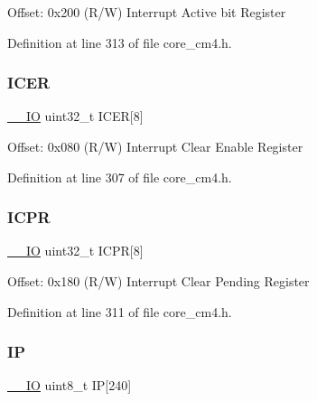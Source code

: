 Offset\+: 0x200 (R/W) Interrupt Active bit Register 

Definition at line 313 of file core\+\_\+cm4.\+h.

\mbox{\label{struct_n_v_i_c___type_af458bc93cfb899fc1c77c5d1f39dde88}} 
\subsubsection{\texorpdfstring{I\+C\+ER}{ICER}}
{\footnotesize\ttfamily \hyperlink{group___c_m_s_i_s__core__definitions_gaec43007d9998a0a0e01faede4133d6be}{\+\_\+\+\_\+\+IO} uint32\+\_\+t I\+C\+ER\mbox{[}8\mbox{]}}

Offset\+: 0x080 (R/W) Interrupt Clear Enable Register 

Definition at line 307 of file core\+\_\+cm4.\+h.

\mbox{\label{struct_n_v_i_c___type_a8165d9a8c0090021e56bbe91c2c44667}} 
\subsubsection{\texorpdfstring{I\+C\+PR}{ICPR}}
{\footnotesize\ttfamily \hyperlink{group___c_m_s_i_s__core__definitions_gaec43007d9998a0a0e01faede4133d6be}{\+\_\+\+\_\+\+IO} uint32\+\_\+t I\+C\+PR\mbox{[}8\mbox{]}}

Offset\+: 0x180 (R/W) Interrupt Clear Pending Register 

Definition at line 311 of file core\+\_\+cm4.\+h.

\mbox{\label{struct_n_v_i_c___type_a38c377984f751265667317981f101bb4}} 
\subsubsection{\texorpdfstring{IP}{IP}}
{\footnotesize\ttfamily \hyperlink{group___c_m_s_i_s__core__definitions_gaec43007d9998a0a0e01faede4133d6be}{\+\_\+\+\_\+\+IO} uint8\+\_\+t IP\mbox{[}240\mbox{]}}

